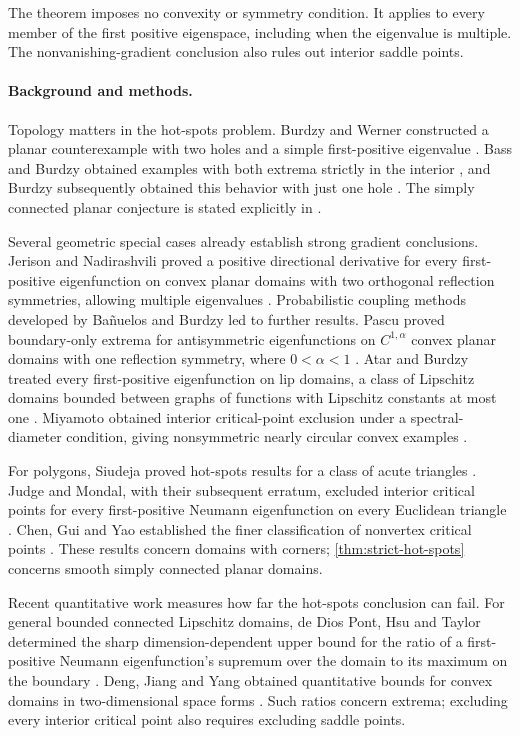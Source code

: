 The theorem imposes no convexity or symmetry condition. It applies to
every member of the first positive eigenspace, including when the
eigenvalue is multiple. The nonvanishing-gradient conclusion also rules
out interior saddle points.

\paragraph{Background and methods.}
Topology matters in the hot-spots problem. Burdzy and Werner constructed
a planar counterexample with two holes and a simple first-positive
eigenvalue \cite{BW99}. Bass and Burdzy obtained examples with both extrema
strictly in the interior \cite{BB00}, and Burdzy subsequently obtained
this behavior with just one hole \cite{Bur05}. The simply connected
planar conjecture is stated explicitly in \cite[Conjecture 1.2(ii)]{Bur05}.

Several geometric special cases already establish strong gradient
conclusions. Jerison and Nadirashvili proved a positive directional
derivative for every first-positive eigenfunction on convex planar domains
with two orthogonal reflection symmetries, allowing multiple eigenvalues
\cite[Theorem 1.4]{JN00}. Probabilistic coupling methods developed by
Ba\~nuelos and Burdzy \cite{BanuelosBurdzy} led to further results. Pascu
proved boundary-only extrema for antisymmetric eigenfunctions on
$C^{1,\alpha}$ convex planar domains with one reflection symmetry, where
$0<\alpha<1$ \cite{Pas02}. Atar and Burdzy treated every first-positive
eigenfunction on lip domains, a class of Lipschitz domains bounded between
graphs of functions with Lipschitz constants at most one \cite{AB04}.
Miyamoto obtained interior critical-point exclusion under a
spectral-diameter condition, giving nonsymmetric nearly circular convex
examples \cite[Lemma 1.2 and Theorem A]{Miy07}.

For polygons, Siudeja proved hot-spots results for a class of acute
triangles \cite{Siu15}. Judge and Mondal, with their subsequent erratum,
excluded interior critical points for every first-positive Neumann
eigenfunction on every Euclidean triangle \cite{JM20,JM22}. Chen, Gui and
Yao established the finer classification of nonvertex critical points
\cite{CGY26}. These results concern domains with corners;
\cref{thm:strict-hot-spots} concerns smooth simply connected planar domains.

Recent quantitative work measures how far the hot-spots conclusion can
fail. For general bounded connected Lipschitz domains, de Dios Pont, Hsu
and Taylor determined the sharp dimension-dependent upper bound for the
ratio of a first-positive Neumann eigenfunction's supremum over the domain
to its maximum on the boundary \cite[Definition 1 and Theorem 4]{dDPHT25}.
Deng, Jiang and Yang obtained quantitative bounds for convex domains in
two-dimensional space forms \cite{DJY26}. Such ratios concern extrema;
excluding every interior critical point also requires excluding saddle points.

